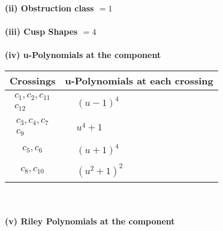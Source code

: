 \documentclass[1p]{elsarticle_modified}
\theoremstyle{definition}
\begin{document}
\flushleft \textbf{(ii) Obstruction class $= 1$}\\~\\
\flushleft \textbf{(iii) Cusp Shapes $= 4$}\\~\\
\newpage\renewcommand{\arraystretch}{1}
\flushleft \textbf{(iv) u-Polynomials at the component}\newline \\
\begin{tabular}{m{50pt}|m{274pt}}
Crossings & \hspace{64pt}u-Polynomials at each crossing \\
\hline $$\begin{aligned}c_{1},c_{2},c_{11}\\c_{12}\end{aligned}$$&$\begin{aligned}
&(u-1)^4
\end{aligned}$\\
\hline $$\begin{aligned}c_{3},c_{4},c_{7}\\c_{9}\end{aligned}$$&$\begin{aligned}
&u^4+1
\end{aligned}$\\
\hline $$\begin{aligned}c_{5},c_{6}\end{aligned}$$&$\begin{aligned}
&(u+1)^4
\end{aligned}$\\
\hline $$\begin{aligned}c_{8},c_{10}\end{aligned}$$&$\begin{aligned}
&(u^2+1)^2
\end{aligned}$\\
\hline
\end{tabular}\\~\\
\newpage\renewcommand{\arraystretch}{1}
\flushleft \textbf{(v) Riley Polynomials at the component}\newline \\
\end{document}
